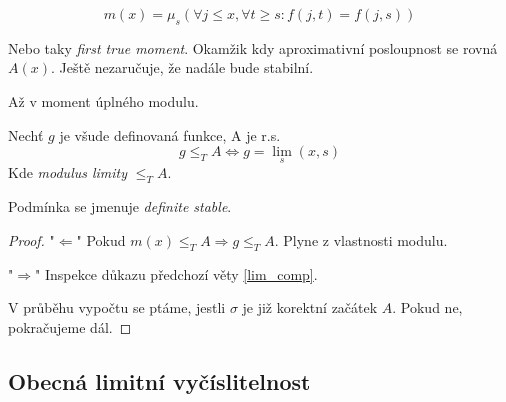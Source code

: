 \begin{definition}
	\[ m(x) = \mu_s(\forall j \leq x, \forall t \geq s: f(j, t) = f(j, s)) \]
\end{definition}

\begin{definition}
	Nebo taky \emph{first true moment}.
	Okamžik kdy aproximativní posloupnost se rovná $A(x)$.
	Ještě nezaručuje, že nadále bude stabilní.

	Až v moment úplného modulu.
\end{definition}

\begin{theorem}
	Nechť $g$ je všude definovaná funkce, A je r.s.
	\[ g \leq_T A \iff g = \lim_s(x, s) \]
	Kde \emph{modulus limity} $\leq_T A$.

	Podmínka se jmenuje \emph{definite stable}.
\end{theorem}
\begin{proof}
	"$\Leftarrow$" Pokud $m(x) \leq_T A \Rightarrow g \leq_T A$.
	Plyne z vlastnosti modulu.

	"$\Rightarrow$" Inspekce důkazu předchozí věty \cref{lim_comp}.

	V průběhu vypočtu se ptáme, jestli $\sigma$ je již korektní začátek $A$. Pokud ne, pokračujeme dál.
\end{proof}

\subsection{Obecná limitní vyčíslitelnost}

